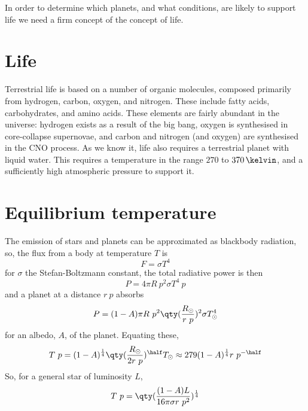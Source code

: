 In order to determine which planets, and what conditions, are likely
to support life we need a firm concept of the concept of life.

\section{Life}
\label{sec:life}

Terrestrial life is based on a number of organic molecules, composed
primarily from hydrogen, carbon, oxygen, and nitrogen. These include
fatty acids, carbohydrates, and amino acids. These elements are fairly
abundant in the universe: hydrogen exists as a result of the big bang,
oxygen is synthesised in core-collapse supernovae, and carbon and
nitrogen (and oxygen) are synthesised in the CNO process. As we know
it, life also requires a terrestrial planet with liquid water. This
requires a temperature in the range $270$ to $370\,\kelvin$, and a
sufficiently high atmospheric pressure to support it.

\section{Equilibrium temperature}
\label{sec:equil-temp}

The emission of stars and planets can be approximated as blackbody
radiation, so, the flux from a body at temperature $T$ is
\begin{equation}
  \label{eq:52}
  F = \sigma T^4
\end{equation}
for $\sigma$ the Stefan-Boltzmann constant, the total radiative power
is then
\begin{equation}
  \label{eq:53}
  P = 4 \pi R~p^2 \sigma T^4~p
\end{equation}
and a planet at a distance $r~p$ absorbs
\begin{equation}
  \label{eq:54}
  P = (1-A) \pi R~p^2 \qty( \frac{R_{\odot}}{r~p} )^2 \sigma T^4_{\odot}
\end{equation}
for an albedo, $A$, of the planet. Equating these,
\begin{equation}
  \label{eq:55}
  T~p = (1-A)^{\frac{1}{4}} \qty( \frac{R_{\odot}}{2 r~p} )^{\half} T_{\odot} \approx 279 (1-A)^{\frac{1}{4}} r~p^{-\half}
\end{equation}
So, for a general star of luminosity $L$,
\begin{equation}
  \label{eq:56}
  T~p = \qty( \frac{(1-A)L}{16 \pi \sigma r~p^2} )^{\frac{1}{4}}
\end{equation}


